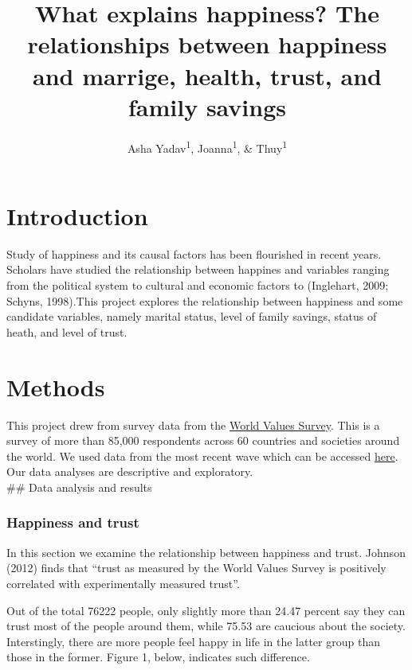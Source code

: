 \documentclass[man, fleqn, noextraspace,floatsintext]{apa6}
\title{What explains happiness? The relationships between happiness and
marrige, health, trust, and family savings}
\author{Asha Yadav\textsuperscript{1}, Joanna\textsuperscript{1}, \&
Thuy\textsuperscript{1}}
\date{}
\affiliation{
\vspace{0.5cm}
\textsuperscript{1} University of Oregon}
\begin{document}
\maketitle

\section{Introduction}\label{introduction}

Study of happiness and its causal factors has been flourished in recent
years. Scholars have studied the relationship between happines and
variables ranging from the political system to cultural and economic
factors to (Inglehart, 2009; Schyns, 1998).This project explores the
relationship between happiness and some candidate variables, namely
marital status, level of family savings, status of heath, and level of
trust.

\section{Methods}\label{methods}

This project drew from survey data from the
\href{http://www.worldvaluessurvey.org/WVSContents.jsp}{World Values
Survey}. This is a survey of more than 85,000 respondents across 60
countries and societies around the world. We used data from the most
recent wave which can be accessed
\href{http://www.worldvaluessurvey.org/WVSDocumentationWV6.jsp}{here}.
Our data analyses are descriptive and exploratory.\\
\#\# Data analysis and results

\subsubsection{Happiness and trust}\label{happiness-and-trust}

In this section we examine the relationship between happiness and trust.
Johnson (2012) finds that \enquote{trust as measured by the World Values
Survey is positively correlated with experimentally measured trust}.

Out of the total 76222 people, only slightly more than 24.47 percent say
they can trust most of the people around them, while 75.53 are caucious
about the society. Interstingly, there are more people feel happy in
life in the latter group than those in the former. Figure 1, below,
indicates such difference.
\end{document}
